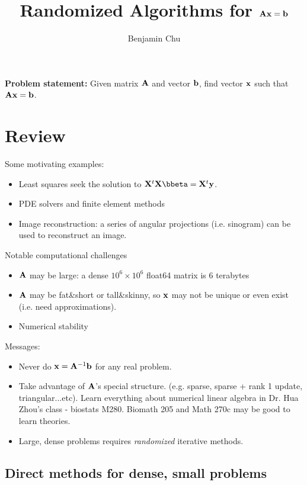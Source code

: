 \documentclass[./some_latex_template.tex]{subfiles}
\begin{document}
\title{Randomized Algorithms for $\mathbf{A}\mathbf{x} = \mathbf{b}$}
\author{Benjamin Chu}
\maketitle

\textbf{Problem statement:} Given matrix $\mathbf{A}$ and vector $\mathbf{b}$, find vector $\mathbf{x}$ such that $\mathbf{A} \mathbf{x} = \mathbf{b}$.

\section{Review}

\noindent Some motivating examples:

\begin{itemize}
	\item Least squares seek the solution to $\bX^t\bX \bbeta = \bX^t \by$. 
	\item PDE solvers and finite element methods
	\item Image reconstruction: a series of angular projections (i.e. sinogram) can be used to reconstruct an image. 
\end{itemize}

\noindent Notable computational challenges

\begin{itemize}
	\item $\mathbf{A}$ may be large: a dense $10^6 \times 10^6$ float64 matrix is 6 terabytes
	\item $\mathbf{A}$ may be fat\&short or tall\&skinny, so $\mathbf{x}$ may not be unique or even exist (i.e. need approximations). 
	\item Numerical stability
\end{itemize}

\noindent Messages:
 
\begin{itemize}
	\item Never do $\mathbf{x} = \mathbf{A}^{-1}\mathbf{b}$ for any real problem.
	\item Take advantage of $\mathbf{A}$'s special structure. (e.g. sparse, sparse + rank 1 update, triangular...etc). Learn everything about numerical linear algebra in Dr. Hua Zhou's class -  biostats M280. Biomath 205 and Math 270c may be good to learn theories. 
	\item Large, dense problems requires \textit{randomized} iterative methods. 
\end{itemize}

\subsection{Direct methods for dense, small problems}
\end{document}
